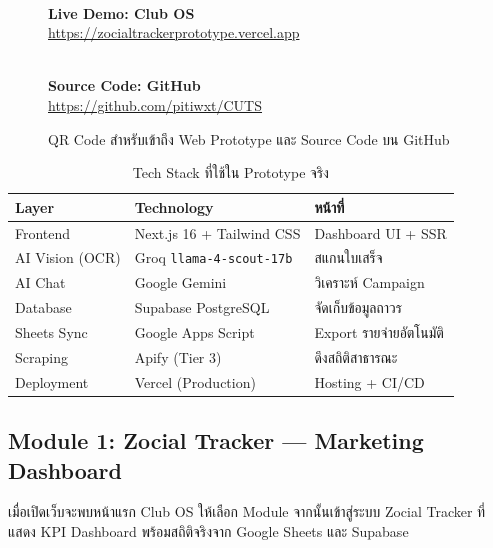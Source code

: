\documentclass[10pt,a4paper]{article}
\begin{document}
\begin{figure}[h!]
\centering
\begin{minipage}{0.45\textwidth}
  \centering
  \\[0.3cm]
  {\small\bfseries\color{chulapink} Live Demo: Club OS}\\[0.1cm]
  {\footnotesize\url{https://zocialtrackerprototype.vercel.app}}
\end{minipage}
\hfill
\begin{minipage}{0.45\textwidth}
  \centering
  \\[0.3cm]
  {\small\bfseries\color{darkblue} Source Code: GitHub}\\[0.1cm]
  {\footnotesize\url{https://github.com/pitiwxt/CUTS}}
\end{minipage}
\caption{\chulafont QR Code สำหรับเข้าถึง Web Prototype และ Source Code บน GitHub}
\end{figure}

\begin{table}[h!]
\centering
\caption{\chulafont Tech Stack ที่ใช้ใน Prototype จริง}
\begin{tabular}{lll}
\toprule
\textbf{Layer} & \textbf{Technology} & \textbf{หน้าที่} \\
\midrule
Frontend & Next.js 16 + Tailwind CSS & Dashboard UI + SSR \\
AI Vision (OCR) & Groq \texttt{llama-4-scout-17b} & สแกนใบเสร็จ \\
AI Chat & Google Gemini & วิเคราะห์ Campaign \\
Database & Supabase PostgreSQL & จัดเก็บข้อมูลถาวร \\
Sheets Sync & Google Apps Script & Export รายจ่ายอัตโนมัติ \\
Scraping & Apify (Tier 3) & ดึงสถิติสาธารณะ \\
Deployment & Vercel (Production) & Hosting + CI/CD \\
\bottomrule
\end{tabular}
\end{table}

\subsection{Module 1: Zocial Tracker — Marketing Dashboard}

\noindent เมื่อเปิดเว็บจะพบหน้าแรก Club OS ให้เลือก Module จากนั้นเข้าสู่ระบบ Zocial Tracker ที่แสดง KPI Dashboard พร้อมสถิติจริงจาก Google Sheets และ Supabase
\end{document}
